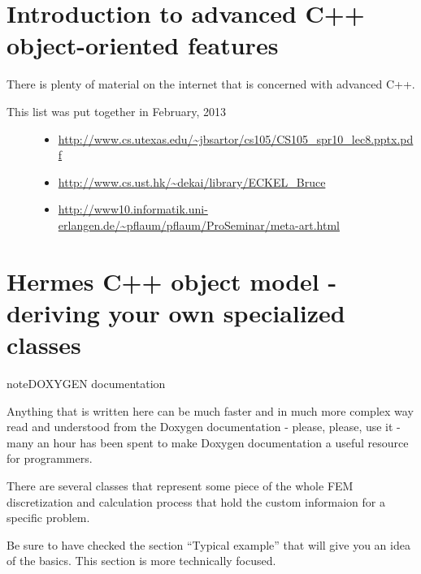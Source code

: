 \documentclass[a4paper,0pt,english]{sphinxmanual}
\begin{document}
\section{Introduction to advanced C++ object-oriented features}
\label{src/introOOP:introduction-to-advanced-c-object-oriented-features}\label{src/introOOP::doc}
There is plenty of material on the internet that is concerned with advanced C++.
\begin{description}
\item[{This list was put together in February, 2013}] \leavevmode\begin{itemize}
\item {} 
\href{http://www.cs.utexas.edu/~jbsartor/cs105/CS105\_spr10\_lec8.pptx.pdf}{http://www.cs.utexas.edu/\textasciitilde{}jbsartor/cs105/CS105\_spr10\_lec8.pptx.pdf}

\item {} 
\href{http://www.cs.ust.hk/~dekai/library/ECKEL\_Bruce}{http://www.cs.ust.hk/\textasciitilde{}dekai/library/ECKEL\_Bruce}

\item {} 
\href{http://www10.informatik.uni-erlangen.de/~pflaum/pflaum/ProSeminar/meta-art.html}{http://www10.informatik.uni-erlangen.de/\textasciitilde{}pflaum/pflaum/ProSeminar/meta-art.html}

\end{itemize}

\end{description}


\section{Hermes C++ object model - deriving your own specialized classes}
\label{src/hermesOO::doc}\label{src/hermesOO:hermes-c-object-model-deriving-your-own-specialized-classes}
\begin{notice}{note}{DOXYGEN documentation}

Anything that is written here can be much faster and in much more complex way read and understood from the Doxygen documentation - please, please, use it - many an hour has been spent to make Doxygen documentation a useful resource for programmers.
\end{notice}

There are several classes that represent some piece of the whole FEM discretization and calculation process that hold the custom informaion for a specific problem.

Be sure to have checked the section ``Typical example'' that will give you an idea of the basics. This section is more technically focused.
\end{document}
